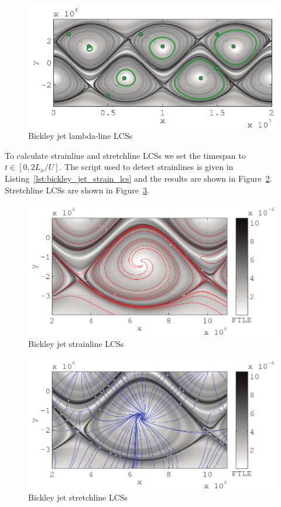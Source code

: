 \documentclass{article}
\begin{document}
\begin{figure}
  \centering
  \includegraphics[width=.85\textwidth]{graphics/bickley_jet/lambda_lcs_full}
  \caption{Bickley jet lambda-line LCSs}
  \label{fig:Bickley_jet_lambda_LCS_full}
\end{figure}

To calculate strainline and stretchline LCSs we set the timespan to $t \in [0,2L_x/U]$. The script used to detect strainlines is given in Listing~\ref{lst:bickley_jet_strain_lcs} and the results are shown in Figure~\ref{fig:Bickley_jet_strain_lcs}. Stretchline LCSs are shown in Figure~\ref{fig:Bickley_jet_stretch_lcs}.



\begin{figure}
  \centering
  \includegraphics[width=.85\textwidth]{graphics/bickley_jet/strain_lcs}
  \caption{Bickley jet strainline LCSs}
  \label{fig:Bickley_jet_strain_lcs}
\end{figure}

\begin{figure}
  \centering
  \includegraphics[width=.85\textwidth]{graphics/bickley_jet/stretch_lcs}
  \caption{Bickley jet stretchline LCSs}
  \label{fig:Bickley_jet_stretch_lcs}
\end{figure}
\end{document}
